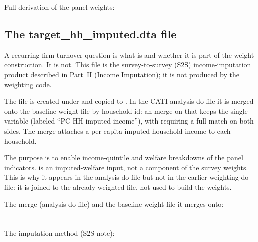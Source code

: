 \begin{refbox}
Full derivation of the panel weights:\\
\end{refbox}

\subsection{The target\_hh\_imputed.dta file}

A recurring firm-turnover question is what  is and whether it is part
of the weight construction. It is not. This file is the survey-to-survey (S2S) income-imputation
product described in Part~II (Income Imputation); it is not produced by the weighting code.

\begin{sloppypar}
The file is created under  and copied to
. In the CATI analysis do-file it is merged onto
the baseline weight file by household id: an  merge on  that keeps the single
variable  (labeled ``PC HH imputed income''), with  requiring a
full match on both sides. The merge attaches a per-capita imputed household income to each
household.
\end{sloppypar}

The purpose is to enable income-quintile and welfare breakdowns of the panel indicators.
 is an imputed-welfare input, not a component of the survey weights. This is
why it appears in the analysis do-file but not in the earlier weighting do-file: it is joined to
the already-weighted file, not used to build the weights.

\begin{sloppypar}
\begin{refbox}
The merge (analysis do-file) and the baseline weight file it merges onto:\\
\\
\\[4pt]
The imputation method (S2S note):\\
\end{refbox}
\end{sloppypar}
